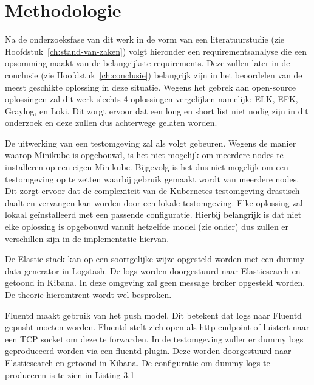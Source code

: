 
\chapter{Methodologie}
\label{ch:methodologie}


Na de onderzoeksfase van dit werk in de vorm van een literatuurstudie (zie Hoofdstuk~\ref{ch:stand-van-zaken}) volgt hieronder een requirementsanalyse die een opsomming maakt van de belangrijkste requirements. Deze zullen later in de conclusie (zie Hoofdstuk~\ref{ch:conclusie}) belangrijk zijn in het beoordelen van de meest geschikte oplossing in deze situatie. Wegens het gebrek aan open-source oplossingen zal dit werk slechts 4 oplossingen vergelijken namelijk: ELK, EFK, Graylog, en Loki. Dit zorgt ervoor dat een long en short list niet nodig zijn in dit onderzoek en deze zullen dus achterwege gelaten worden. 

De uitwerking van een testomgeving zal als volgt gebeuren. Wegens de manier waarop Minikube is opgebouwd, is het niet mogelijk om meerdere nodes te installeren op een eigen Minikube. Bijgevolg is het dus niet mogelijk om een testomgeving op te zetten waarbij gebruik gemaakt wordt van meerdere nodes. Dit zorgt ervoor dat de complexiteit van de Kubernetes testomgeving drastisch daalt en vervangen kan worden door een lokale testomgeving. Elke oplossing zal lokaal geïnstalleerd met een passende configuratie. Hierbij belangrijk is dat niet elke oplossing is opgebouwd vanuit hetzelfde model (zie onder) dus zullen er verschillen zijn in de implementatie hiervan. 

De Elastic stack kan op een soortgelijke wijze opgesteld worden met een dummy data generator in Logstash. De logs worden doorgestuurd naar Elasticsearch en getoond in Kibana. In deze omgeving zal geen message broker opgesteld worden. De theorie hieromtrent wordt wel besproken.

Fluentd maakt gebruik van het push model. Dit betekent dat logs naar Fluentd gepusht moeten worden. Fluentd stelt zich open als http endpoint of luistert naar een TCP socket om deze te forwarden. In de testomgeving zuller er dummy logs geproduceerd worden via een fluentd plugin. Deze worden doorgestuurd naar Elasticsearch en getoond in Kibana. De configuratie om dummy logs te produceren is te zien in Listing 3.1

